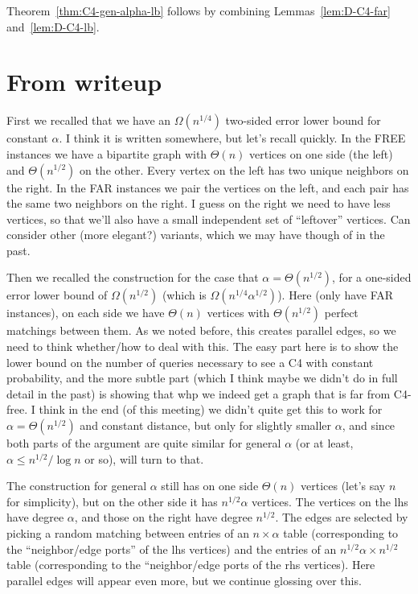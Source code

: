 \documentclass{article}
\newcommand{\commentt}[1]{ {}}
\newcommand{\ForFuture}[1]{}
\begin{document}
\bigskip
Theorem~\ref{thm:C4-gen-alpha-lb} follows by combining Lemmas~\ref{lem:D-C4-far} and~\ref{lem:D-C4-lb}.
\ForFuture{D: or spell it out}

\iffalse
\newpage
\section{From writeup}

\commentt{DR: Base on the following sketch (from the summaries file)}


First we recalled that we have an $\Omega(n^{1/4})$ two-sided error lower bound for constant $\alpha$. I think it is written somewhere, but let's recall quickly. In the FREE instances we have a bipartite graph with $\Theta(n)$ vertices on one side (the left) and $\Theta(n^{1/2})$ on the other. Every vertex on the left has two unique neighbors on the right. In the FAR instances we pair the vertices on the left, and each pair has the same two neighbors on the right. I guess on the right we need to have less vertices, so that we'll also have a small independent set of ``leftover'' vertices. Can consider other (more elegant?) variants, which we may have though of in the past.

Then we recalled the construction for the case that $\alpha = \Theta(n^{1/2})$, for a one-sided error lower bound of $\Omega(n^{1/2})$ (which is $\Omega(n^{1/4} \alpha^{1/2})$). Here (only have FAR instances), on each side we have $\Theta(n)$ vertices with $\Theta(n^{1/2})$ perfect matchings between them. As we noted before, this creates parallel edges, so we need to think whether/how to deal with this. The easy part here is to show the lower bound on the number of queries necessary to see a C4  with constant probability, and the more subtle part (which I think maybe we didn't do in full detail in the past) is showing that whp we indeed get a graph that is far from C4-free. I think in the end (of this meeting) we didn't quite get this to work for $\alpha = \Theta(n^{1/2})$ and constant distance, but only for slightly smaller $\alpha$, and since  both parts of the argument are quite similar for general $\alpha$ (or at least, $\alpha \leq n^{1/2}/\log n$ or so), will turn to that.

The construction for general $\alpha$ still has on one side $\Theta(n)$ vertices (let's say $n$ for simplicity), but on the other side it has $n^{1/2}\alpha$ vertices. The vertices on the lhs have degree $\alpha$, and those on the right have degree $n^{1/2}$.
The edges are selected by picking a random matching between entries of an $n\times \alpha$ table (corresponding to the ``neighbor/edge ports'' of the lhs vertices) and the entries of an $n^{1/2}\alpha \times n^{1/2}$ table (corresponding to the ``neighbor/edge ports of the rhs vertices). Here parallel edges will appear even more, but we continue glossing over this.
\end{document}
